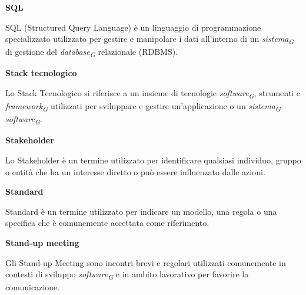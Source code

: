\documentclass{article}
\begin{document}
\vspace{0.4cm}

\textbf{SQL}

\vspace{0.1cm}

SQL (Structured Query Language) è un linguaggio di programmazione specializzato utilizzato per gestire e manipolare i dati all'interno di un \textit{sistema}\textsubscript{\textit{G}} di gestione del \textit{database}\textsubscript{\textit{G}} relazionale (RDBMS).

\vspace{0.4cm}

\textbf{Stack tecnologico}

\vspace{0.1cm}

Lo Stack Tecnologico si riferisce a un insieme di tecnologie \textit{software}\textsubscript{\textit{G}}, strumenti e \textit{framework}\textsubscript{\textit{G}} utilizzati per sviluppare e gestire un'applicazione o un \textit{sistema}\textsubscript{\textit{G}} \textit{software}\textsubscript{\textit{G}}.

\vspace{0.4cm}

\textbf{Stakeholder}

\vspace{0.1cm}

Lo Stakeholder è un termine utilizzato per identificare qualsiasi individuo, gruppo o entità che ha un interesse diretto o può essere influenzato dalle azioni.

\vspace{0.4cm}

\textbf{Standard}

\vspace{0.1cm}

Standard è un termine utilizzato per indicare un modello, una regola o una specifica che è comunemente accettata come riferimento.

\vspace{0.4cm}

\textbf{Stand-up meeting}

\vspace{0.1cm}

Gli Stand-up Meeting sono incontri brevi e regolari utilizzati comunemente in contesti di sviluppo \textit{software}\textsubscript{\textit{G}} e in ambito lavorativo per favorire la comunicazione.

\vspace{0.4cm}
\end{document}
